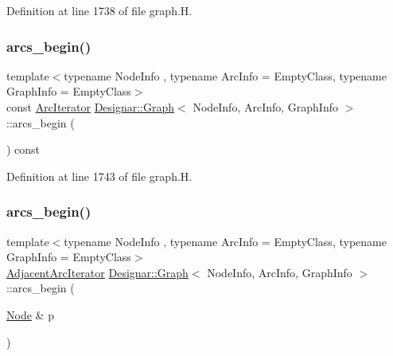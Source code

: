 Definition at line 1738 of file graph.\+H.

\mbox{\label{class_designar_1_1_graph_a3906cae09045bb9c037e1c3c4e64dd97}} 
\subsubsection{\texorpdfstring{arcs\+\_\+begin()}{arcs\_begin()}\hspace{0.1cm}{\footnotesize\ttfamily [2/4]}}
{\footnotesize\ttfamily template$<$typename Node\+Info , typename Arc\+Info  = Empty\+Class, typename Graph\+Info  = Empty\+Class$>$ \\
const \hyperlink{class_designar_1_1_graph_1_1_arc_iterator}{Arc\+Iterator} \hyperlink{class_designar_1_1_graph}{Designar\+::\+Graph}$<$ Node\+Info, Arc\+Info, Graph\+Info $>$\+::arcs\+\_\+begin (\begin{DoxyParamCaption}{ }\end{DoxyParamCaption}) const\hspace{0.3cm}{\ttfamily [inline]}}



Definition at line 1743 of file graph.\+H.

\mbox{\label{class_designar_1_1_graph_a9488f4193d227a690f46e91a11dd830a}} 
\subsubsection{\texorpdfstring{arcs\+\_\+begin()}{arcs\_begin()}\hspace{0.1cm}{\footnotesize\ttfamily [3/4]}}
{\footnotesize\ttfamily template$<$typename Node\+Info , typename Arc\+Info  = Empty\+Class, typename Graph\+Info  = Empty\+Class$>$ \\
\hyperlink{class_designar_1_1_graph_1_1_adjacent_arc_iterator}{Adjacent\+Arc\+Iterator} \hyperlink{class_designar_1_1_graph}{Designar\+::\+Graph}$<$ Node\+Info, Arc\+Info, Graph\+Info $>$\+::arcs\+\_\+begin (\begin{DoxyParamCaption}\item[{\hyperlink{class_designar_1_1_graph_a5dfc7dba9d092ac489c72e40390c37d0}{Node} \&}]{p }\end{DoxyParamCaption})\hspace{0.3cm}{\ttfamily [inline]}}



